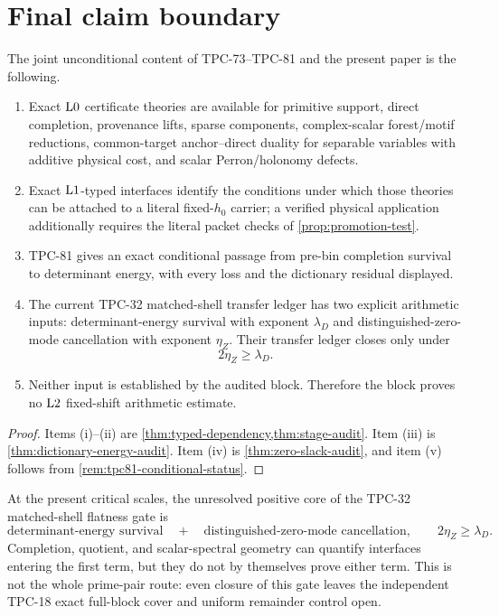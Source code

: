 \section{Final claim boundary}
\label{sec:claim-boundary}

\begin{theorem}
\label{thm:final-audit}
The joint unconditional content of TPC-73--TPC-81 and the present
paper is the following.
\begin{enumerate}[label=(\roman*),leftmargin=2.2em]
\item Exact \(\mathrm{L0}\) certificate theories are available for
primitive support, direct completion, provenance lifts, sparse
components, complex-scalar forest/motif reductions, common-target
anchor--direct duality for separable variables with additive physical
cost, and scalar Perron/holonomy defects.
\item Exact \(\mathrm{L1}\)-typed interfaces identify the conditions under
which those theories can be attached to a literal fixed-\(h_0\)
carrier; a verified physical application additionally requires the
literal packet checks of \cref{prop:promotion-test}.
\item TPC-81 gives an exact conditional passage from pre-bin
completion survival to determinant energy, with every loss and the
dictionary residual displayed.
\item The current TPC-32 matched-shell transfer ledger has two
explicit arithmetic inputs:
determinant-energy survival with exponent \(\lambda_D\) and
distinguished-zero-mode cancellation with exponent \(\eta_Z\).
Their transfer ledger closes only under
\[
 2\eta_Z\ge\lambda_D.
\]
\item Neither input is established by the audited block.  Therefore
the block proves no \(\mathrm{L2}\) fixed-shift arithmetic estimate.
\end{enumerate}
\end{theorem}

\begin{proof}
Items (i)--(ii) are
\cref{thm:typed-dependency,thm:stage-audit}.  Item (iii) is
\cref{thm:dictionary-energy-audit}.  Item (iv) is
\cref{thm:zero-slack-audit}, and item (v) follows from
\cref{rem:tpc81-conditional-status}.
\end{proof}

\begin{corollary}
\label{cor:genuine-arithmetic-gate}
At the present critical scales, the unresolved positive core of the
TPC-32 matched-shell flatness gate is
\begin{equation}
\boxed{
\text{determinant-energy survival}
\quad+\quad
\text{distinguished-zero-mode cancellation},
\qquad
2\eta_Z\ge\lambda_D.}
\label{eq:final-core}
\end{equation}
Completion, quotient, and scalar-spectral geometry can quantify
interfaces entering the first term, but they do not by themselves
prove either term.  This is not the whole prime-pair route: even
closure of this gate leaves the independent TPC-18 exact full-block
cover and uniform remainder control open.
\end{corollary}

